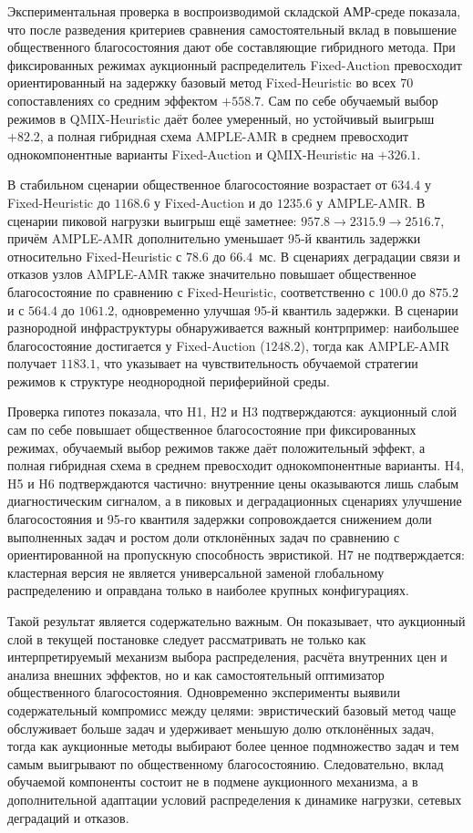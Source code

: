 Экспериментальная проверка в воспроизводимой складской АМР-среде показала, что после разведения критериев сравнения самостоятельный вклад в повышение общественного благосостояния дают обе составляющие гибридного метода. При фиксированных режимах аукционный распределитель Fixed-Auction превосходит ориентированный на задержку базовый метод Fixed-Heuristic во всех 70 сопоставлениях со средним эффектом $+558.7$. Сам по себе обучаемый выбор режимов в QMIX-Heuristic даёт более умеренный, но устойчивый выигрыш $+82.2$, а полная гибридная схема AMPLE-AMR в среднем превосходит однокомпонентные варианты Fixed-Auction и QMIX-Heuristic на $+326.1$.

В стабильном сценарии общественное благосостояние возрастает от $634.4$ у Fixed-Heuristic до $1168.6$ у Fixed-Auction и до $1235.6$ у AMPLE-AMR. В сценарии пиковой нагрузки выигрыш ещё заметнее: $957.8 \rightarrow 2315.9 \rightarrow 2516.7$, причём AMPLE-AMR дополнительно уменьшает 95-й квантиль задержки относительно Fixed-Heuristic с $78.6$ до $66.4$~мс. В сценариях деградации связи и отказов узлов AMPLE-AMR также значительно повышает общественное благосостояние по сравнению с Fixed-Heuristic, соответственно с $100.0$ до $875.2$ и с $564.4$ до $1061.2$, одновременно улучшая 95-й квантиль задержки. В сценарии разнородной инфраструктуры обнаруживается важный контрпример: наибольшее благосостояние достигается у Fixed-Auction ($1248.2$), тогда как AMPLE-AMR получает $1183.1$, что указывает на чувствительность обучаемой стратегии режимов к структуре неоднородной периферийной среды.

Проверка гипотез показала, что H1, H2 и H3 подтверждаются: аукционный слой сам по себе повышает общественное благосостояние при фиксированных режимах, обучаемый выбор режимов также даёт положительный эффект, а полная гибридная схема в среднем превосходит однокомпонентные варианты. H4, H5 и H6 подтверждаются частично: внутренние цены оказываются лишь слабым диагностическим сигналом, а в пиковых и деградационных сценариях улучшение благосостояния и 95-го квантиля задержки сопровождается снижением доли выполненных задач и ростом доли отклонённых задач по сравнению с ориентированной на пропускную способность эвристикой. H7 не подтверждается: кластерная версия не является универсальной заменой глобальному распределению и оправдана только в наиболее крупных конфигурациях.

Такой результат является содержательно важным. Он показывает, что аукционный слой в текущей постановке следует рассматривать не только как интерпретируемый механизм выбора распределения, расчёта внутренних цен и анализа внешних эффектов, но и как самостоятельный оптимизатор общественного благосостояния. Одновременно эксперименты выявили содержательный компромисс между целями: эвристический базовый метод чаще обслуживает больше задач и удерживает меньшую долю отклонённых задач, тогда как аукционные методы выбирают более ценное подмножество задач и тем самым выигрывают по общественному благосостоянию. Следовательно, вклад обучаемой компоненты состоит не в подмене аукционного механизма, а в дополнительной адаптации условий распределения к динамике нагрузки, сетевых деградаций и отказов.

